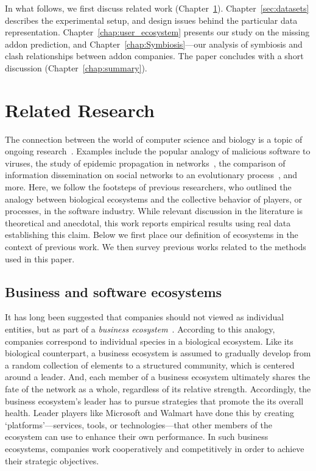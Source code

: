 \documentclass[ijoc,nonblindrev]{informs3} %
\numberwithin{equation}{subsection}
\begin{document}
In what follows, we first discuss related work (Chapter~\ref{sec:related}). Chapter~\ref{sec:datasets} describes the experimental setup, and design issues behind the particular data representation. Chapter~\ref{chap:user_ecosystem} presents our study on the missing addon prediction, and Chapter~\ref{chap:Symbiosis}---our analysis of symbiosis and clash relationships between addon companies. The paper concludes with a short discussion (Chapter~\ref{chap:summary}).

\section{Related Research}
\label{sec:related}

The connection between the world of computer science and biology is a topic of ongoing research~\citep{rasmus2015computational}. Examples include the popular analogy of malicious software to viruses, the study of epidemic propagation in networks~\citep{christosKAIS14}, the comparison of information dissemination on social networks to an evolutionary process~\citep{adamicWSDM16}, and more. Here, we follow the footsteps of previous researchers, who outlined the analogy between biological ecosystems and the collective behavior of players, or processes, in the software industry. While relevant discussion in the literature is theoretical and anecdotal, this work reports empirical results using real data establishing this claim. Below we first place our definition of ecosystems in the context of previous work. We then survey previous works related to the methods used in this paper.

\subsection{Business and software ecosystems}
\label{sec:bio_ecosystem}

It has long been suggested that companies should not viewed as individual entities, but as part of a {\it business ecosystem}~\citep{moore93,iansiti04}. According to this analogy, companies correspond to individual species in a biological ecosystem. Like its biological counterpart, a business ecosystem is assumed to gradually develop from a random collection of elements to a structured community, which is centered around a leader. And, each member of a business ecosystem ultimately shares the fate of the network as a whole, regardless of its relative strength. Accordingly, the business ecosystem's leader has to pursue strategies that promote the its overall health. Leader players like Microsoft and Walmart have done this by creating `platforms'—services, tools, or technologies—that other members of the ecosystem can use to enhance their own performance. In such business ecosystems, companies work cooperatively and competitively in order to achieve their strategic objectives. 
\end{document}
